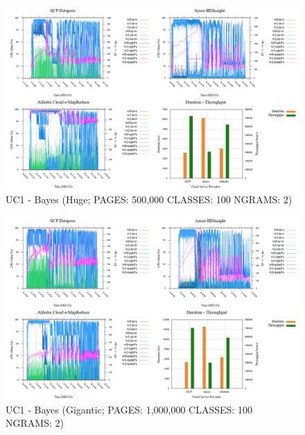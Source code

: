 \documentclass[review]{elsarticle}
\begin{document}
\begin{figure}[b]
	\caption{UC1 - Bayes (Huge; PAGES: 500,000 CLASSES: 100 NGRAMS: 2)}
	\label{fig:uc1-bayes-h-cmidt}
	\includegraphics[width=\textwidth]{uc1-bayes-h-cmidt}
	\centering
\end{figure}

\begin{figure}[b]
	\caption{UC1 - Bayes (Gigantic; PAGES: 1,000,000 CLASSES: 100 NGRAMS: 2)}
	\label{fig:uc1-bayes-g-cmidt}
	\includegraphics[width=\textwidth]{uc1-bayes-g-cmidt}
	\centering
\end{figure}
\end{document}
